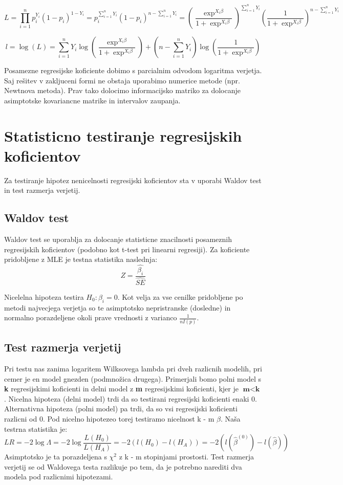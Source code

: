 \documentclass[letterpaper,11pt]{article}
\begin{document}
$$L = \prod_{i=1}^n p_i^{Y_i}(1-p_i)^{1-Y_i}=p_i^{\sum_{i=1}^n Y_i}(1-p_i)^{n-\sum_{i=1}^n Y_i} = 
(\frac{\exp^{X_i \beta}}{1+\exp^{X_i \beta}})^{\sum_{i=1}^n Y_i}(\frac{1}{1+\exp^{X_i \beta}})^{n-\sum_{i=1}^n Y_i}$$

$$l = \log{(L)} = \sum_{i=1}^n Y_i \log{(\frac{\exp^{X_i \beta}}{1+\exp^{X_i \beta}})} + (n-\sum_{i=1}^n Y_i)\log{(\frac{1}{1+\exp^{X_i \beta}})}$$

\noindent Posamezne regresijske koficiente dobimo s parcialnim odvodom logaritma verjetja. Saj rešitev v zakljuceni formi ne obstaja uporabimo numerice metode (npr. Newtnova metoda). Prav tako dolocimo informacijsko matriko za dolocanje asimptotske kovariancne matrike in intervalov zaupanja.


\section{Statisticno testiranje regresijskih koficientov}
Za testiranje hipotez nenicelnosti regresijski koficientov sta v uporabi Waldov test in  test razmerja verjetij.

\subsection{Waldov test}
Waldov test se uporablja za dolocanje statisticne znacilnosti posameznih regresijskih koficientov (podobno kot t-test pri linearni regresiji). Za koficiente pridobljene z MLE je testna statistika naslednja:
$$Z = \frac{\hat{\beta_i}}{\hat{SE}}$$

\noindent Nicelelna hipoteza testira $H_0: \beta_i =0$. Kot velja za vse cenilke pridobljene po metodi najvecjega verjetja so te asimptotsko nepristranske (dosledne) in normalno porazdeljene okoli prave vrednosti z varianco $\frac{1}{nI(p)}$.

\subsection{Test razmerja verjetij}
Pri testu nas zanima logaritem Wilksovega lambda pri dveh razlicnih modelih, pri cemer je en model gnezden (podmnožica drugega). Primerjali bomo polni model s \textbf{k} regresijskimi koficienti in delni model z \textbf{m} regresijskimi koficienti, kjer je $\textbf{m} < \textbf{k}$. Nicelna hipoteza (delni model) trdi da so testirani regresijski koficienti enaki 0. Alternativna hipoteza (polni model) pa trdi, da so vsi regresijski koficienti razlicni od 0. Pod nicelno hipotezeo torej testiramo nicelnost k - m $\beta$. Naša testrna statistika je:
$$LR = -2 \log{\Lambda} = -2 \log{\frac{L(H_0)}{L(H_A)}} = -2(l(H_0) - l(H_A))=-2(l(\hat{\beta}^{(0)}) - l(\hat{\beta}))$$
Asimptotsko je ta porazdeljena s $\chi^2$ z k - m stopinjami prostosti. Test razmerja verjetij se od Waldovega testa razlikuje po tem, da je potrebno narediti dva modela pod razlicnimi hipotezami.
\end{document}
